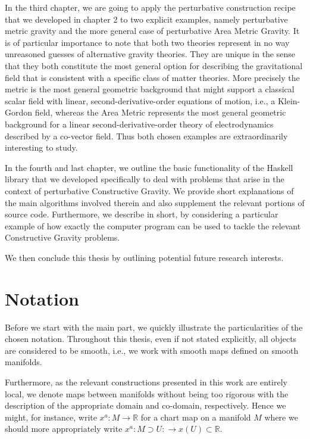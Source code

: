 In the third chapter, we are going to apply the perturbative construction recipe that we developed in chapter 2 to two explicit examples, namely perturbative metric gravity and the more general case of perturbative Area Metric Gravity. It is of particular importance to note that both two theories represent in no way unreasoned guesses of alternative gravity theories. They are unique in the sense that they both constitute the most general option for describing the gravitational field that is consistent with a specific class of matter theories. More precisely the metric is the most general geometric background that might support a classical scalar field with linear, second-derivative-order equations of motion, i.e., a Klein-Gordon field, whereas the Area Metric represents the most general geometric background for a linear second-derivative-order theory of electrodynamics described by a co-vector field. Thus both chosen examples are extraordinarily interesting to study.

In the fourth and last chapter, we outline the basic functionality of the Haskell library that we developed specifically to deal with problems that arise in the context of perturbative Constructive Gravity. We provide short explanations of the main algorithms involved therein and also supplement the relevant portions of source code. Furthermore, we describe in short, by considering a particular example of how exactly the computer program can be used to tackle the relevant Constructive Gravity problems.

We then conclude this thesis by outlining potential future research interests.

\section*{Notation}

Before we start with the main part, we quickly illustrate the particularities of the chosen notation. Throughout this thesis, even if not stated explicitly, all objects are considered to be smooth, i.e., we work with smooth maps defined on smooth manifolds. 

Furthermore, as the relevant constructions presented in this work are entirely local, we denote maps between manifolds without being too rigorous with the description of the appropriate domain and co-domain, respectively. Hence we might, for instance, write $x^a : M
\rightarrow \mathbb{R}$ for a chart map on a manifold $M$ where we should more appropriately write $x^a : M \supset U : \rightarrow x(U) \subset \mathbb{R} $. 

